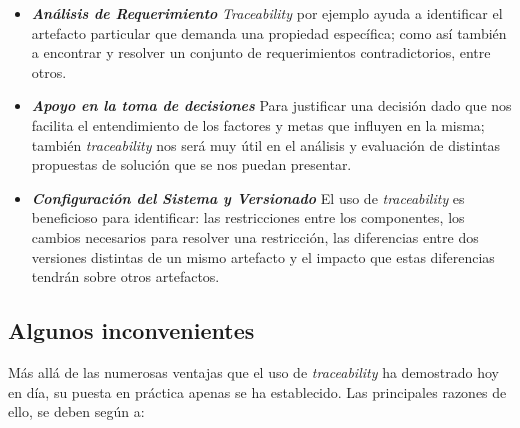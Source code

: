 \documentclass[a4paper,12pt,oneside,spanish]{book}
\begin{document}
\begin{itemize}
\item \textit{\textbf{Análisis de Requerimiento}} \textit{Traceability} por ejemplo ayuda a identificar el artefacto particular que demanda una propiedad específica; como así también a encontrar y resolver un conjunto de requerimientos contradictorios, entre otros.

\item \textit{\textbf{Apoyo en la toma de decisiones}} Para justificar una decisión dado que nos facilita el entendimiento de los factores y metas que influyen en la misma; también \textit{traceability} nos será muy útil en el análisis y evaluación de distintas propuestas de solución que se nos puedan presentar.

\item \textit{\textbf{Configuración del Sistema y Versionado}} El uso de \textit{traceability} es beneficioso para identificar: las restricciones entre los componentes, los cambios necesarios para resolver una restricción, las diferencias entre dos versiones distintas de un mismo artefacto y el impacto que estas diferencias tendrán sobre otros artefactos.

\end{itemize}


\subsection{Algunos inconvenientes}

Más allá de las numerosas ventajas que el uso de \textit{traceability} ha demostrado hoy en día, su puesta en práctica apenas se ha establecido. Las principales razones de ello, se deben según \cite{GrammelVoigt} a:
\end{document}

